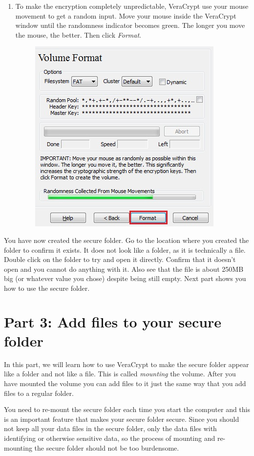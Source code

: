 \documentclass{tufte-handout}
\begin{document}
\begin{enumerate}
	
	\item To make the encryption completely unpredictable, VeraCrypt use your mouse movement to get a random input. Move your mouse inside the VeraCrypt window until the randomness indicator becomes green. The longer you move the mouse, the better. Then click \textit{Format}.
	\begin{figure}%
		\includegraphics[width=.7\linewidth]{img/vc_install_9.png}
	\end{figure}
	\FloatBarrier
\end{enumerate}

	\noindent You have now created the secure folder. Go to the location where you created the folder to confirm it exists. It does not look like a folder, as it is technically a file. Double click on the folder to try and open it directly. Confirm that it doesn't open and you cannot do anything with it. Also see that the file is about 250MB big (or whatever value you chose) despite being still empty. Next part shows you how to use the secure folder.

\section{Part 3: Add files to your secure folder}

	In this part, we will learn how to use VeraCrypt to make the secure folder appear like a folder and not like a file. This is called \textit{mounting} the volume. After you have mounted the volume you can add files to it just the same way that you add files to a regular folder.
	
	You need to re-mount the secure folder each time you start the computer and this is an important feature that makes your secure folder secure. Since you should not keep all your data files in the secure folder, only the data files with identifying or otherwise sensitive data, so the process of mounting and re-mounting the secure folder should not be too burdensome.
	
\end{document}
